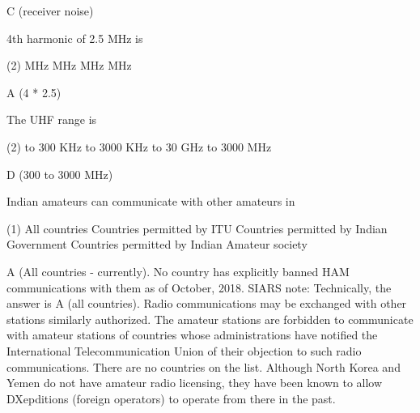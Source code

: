 \documentclass[a4paper]{article}
\begin{document}
\begin{solution}
	C (receiver noise)
\end{solution}

\vspace{5mm}



\begin{question}4th harmonic of 2.5 MHz is
	\begin{tasks}(2)
		 MHz
		 MHz
		 MHz
		 MHz
	\end{tasks}
\end{question}

\begin{solution}
	A (4 * 2.5)
\end{solution}

\vspace{5mm}



\begin{question}The UHF range is
	\begin{tasks}(2)
		 to 300 KHz
		 to 3000 KHz
		 to 30 GHz
		 to 3000 MHz
	\end{tasks}
\end{question}

\begin{solution}
	D (300 to 3000 MHz)
\end{solution}

\vspace{5mm}



\begin{question}Indian amateurs can communicate with other amateurs in
	\begin{tasks}(1)
		\task All countries
		\task Countries permitted by ITU
		\task Countries permitted by Indian Government
		\task Countries permitted by Indian Amateur society
	\end{tasks}
\end{question}

\begin{solution}
	A (All countries - currently). No country has explicitly banned HAM communications with them as of October, 2018. SIARS note: Technically, the answer is \apostrophe{}A\apostrophe{} (all countries). Radio communications may be exchanged with other stations similarly authorized. The amateur stations are forbidden to communicate with amateur stations of countries whose administrations have notified the International Telecommunication Union of their objection to such radio communications. There are no countries on the list. Although North Korea and Yemen do not have amateur radio licensing, they have been known to allow DXepditions (foreign operators) to operate from there in the past.
\end{solution}
\end{document}
